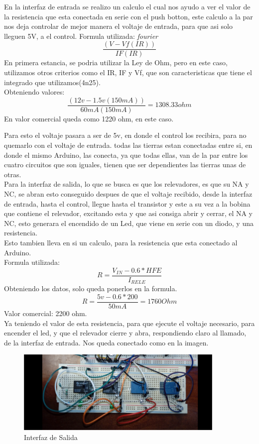 \documentclass[12pt,a4paper]{article}
\begin{document}
En la interfaz de entrada se realizo un calculo el cual nos ayudo a ver el valor de la resistencia que esta conectada en serie con el push botton, este calculo a la par nos deja controlar de mejor manera el voltaje de entrada, para que asi solo lleguen 5V, a el control.
Formula utilizada:
\emph{fourier}
$$ \frac{(V-Vf(IR))}{IF(IR)} $$
En primera estancia, se podria utilizar la Ley de Ohm, pero en este caso, utilizamos otros criterios como el IR, IF y Vf, que son caracteristicas que tiene el integrado que utilizamos(4n25).\\
Obteniendo valores:\\
$$ \frac{(12v-1.5v(150mA))}{60mA(150mA)}= 1308.33 ohm $$
En valor comercial queda como 1220 ohm, en este caso.

Para esto el voltaje pasara a ser de 5v, en donde el control los recibira, para no quemarlo con el voltaje de entrada. todas las tierras estan conectadas entre si, en donde el mismo Arduino, las conecta, ya que todas ellas, van de la par entre los cuatro circuitos que son iguales, tienen que ser dependientes las tierras unas de otras.\\
Para la interfaz de salida, lo que se busca es que los relevadores, es que su NA y NC, se abran esto conseguido despues de que el voltaje recibido, desde la interfaz de entrada, hasta el control, llegue hasta el transistor y este a su vez a la bobina que contiene el relevador, excitando esta y que asi consiga abrir y cerrar, el NA y NC, esto generara el encendido de un Led, que viene en serie con un diodo, y una resistencia.\\
Esto tambien lleva en si un calculo, para la resistencia que esta conectado al Arduino.\\
Formula utilizada:\\
$$ R= \frac{V_{IN}-0.6*HFE}{I_{RELE}} $$
Obteniendo los datos, solo queda ponerlos en la formula.
$$ R= \frac{5v-0.6*200}{50mA}= 1760 Ohm $$
Valor comercial: 2200 ohm.\\
Ya teniendo el valor de esta resistencia, para que ejecute el voltaje necesario, para encender el led, y que el relevador cierre y abra, respondiendo claro al llamado, de la interfaz de entrada. Nos queda conectado como en la imagen.\\

\begin{figure}[hbtp]
\centering
\includegraphics[width=10cm]{Rele.png}
\caption{Interfaz de Salida}
\end{figure}
\end{document}
